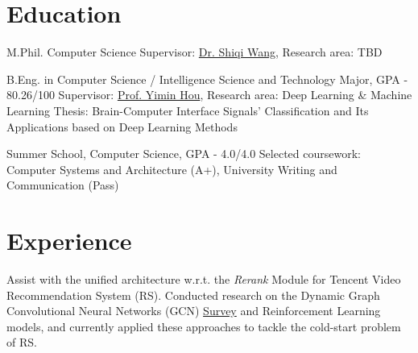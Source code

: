 \documentclass{my_cv}
\begin{document}
\hspace*{\fill}


\hspace*{\fill}


\hspace*{\fill} 

\section{Education}
\workitemstwo
{M.Phil. Computer Science}
{Supervisor: \href{https://www.cs.cityu.edu.hk/~shiqwang/}{Dr. Shiqi Wang}, Research area: TBD}

\workitemsthree
{B.Eng. in Computer Science / Intelligence Science and Technology Major, GPA - 80.26/100}
{Supervisor: \href{mailto:ymh7821@163.com}{Prof. Yimin Hou}, Research area: Deep Learning \& Machine Learning}
{Thesis: Brain-Computer Interface Signals' Classification and Its Applications based on Deep Learning Methods}

\workitemstwo
{Summer School, Computer Science, GPA - 4.0/4.0}
{Selected coursework: Computer Systems and Architecture (A+), University Writing and Communication (Pass)}

\hspace*{\fill} 

\section{Experience}
\workitemstwo
{Assist with the unified architecture w.r.t. the \emph{Rerank} Module for Tencent Video Recommendation System (RS).}
{Conducted research on the Dynamic Graph Convolutional Neural Networks (GCN) \href{https://github.com/SuperBruceJia/paper-reading/raw/master/Graph-Neural-Network/Dynamic-GCN-Survey.pptx}{Survey} and Reinforcement Learning models, and currently applied these approaches to tackle the cold-start problem of RS.}
\end{document}
